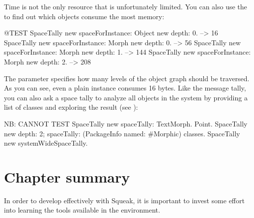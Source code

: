 \documentclass[a4paper,10pt,twoside]{book}
\begin{document}
Time is not the only resource that is unfortunately limited.
You can also use the  to find out which objects consume the most memory:
\begin{code}{@TEST}
SpaceTally new spaceForInstance: Object new depth: 0.	--> 16
SpaceTally new spaceForInstance: Morph new depth: 0.	--> 56
SpaceTally new spaceForInstance: Morph new depth: 1.	--> 144
SpaceTally new spaceForInstance: Morph new depth: 2.	--> 208
\end{code}
\noindent
The  parameter specifies how many levels of the object graph should be traversed.
As you can see, even a plain  instance consumes 16 bytes.
Like the message tally, you can also ask a space tally to analyze all objects in the system by providing a list of classes and exploring the result (see ):
\begin{code}{NB: CANNOT TEST}
SpaceTally new spaceTally: {TextMorph. Point}.
SpaceTally new depth: 2; spaceTally: (PackageInfo named: #Morphic) classes.
SpaceTally new systemWideSpaceTally.
\end{code}

\section{Chapter summary}

In order to develop effectively with Squeak, it is important to invest some effort into learning the tools available in the environment.
\end{document}
